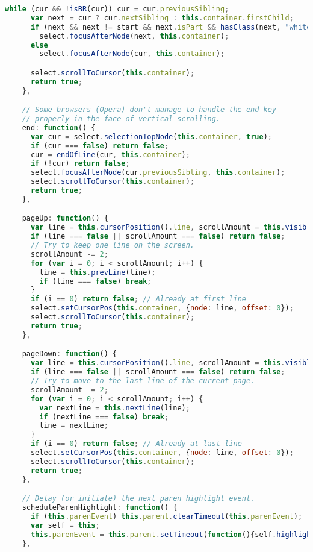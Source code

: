 \begin{lstlisting}[language=Javascript]
      while (cur && !isBR(cur)) cur = cur.previousSibling;
      var next = cur ? cur.nextSibling : this.container.firstChild;
      if (next && next != start && next.isPart && hasClass(next, "whitespace"))
        select.focusAfterNode(next, this.container);
      else
        select.focusAfterNode(cur, this.container);

      select.scrollToCursor(this.container);
      return true;
    },

    // Some browsers (Opera) don't manage to handle the end key
    // properly in the face of vertical scrolling.
    end: function() {
      var cur = select.selectionTopNode(this.container, true);
      if (cur === false) return false;
      cur = endOfLine(cur, this.container);
      if (!cur) return false;
      select.focusAfterNode(cur.previousSibling, this.container);
      select.scrollToCursor(this.container);
      return true;
    },

    pageUp: function() {
      var line = this.cursorPosition().line, scrollAmount = this.visibleLineCount();
      if (line === false || scrollAmount === false) return false;
      // Try to keep one line on the screen.
      scrollAmount -= 2;
      for (var i = 0; i < scrollAmount; i++) {
        line = this.prevLine(line);
        if (line === false) break;
      }
      if (i == 0) return false; // Already at first line
      select.setCursorPos(this.container, {node: line, offset: 0});
      select.scrollToCursor(this.container);
      return true;
    },

    pageDown: function() {
      var line = this.cursorPosition().line, scrollAmount = this.visibleLineCount();
      if (line === false || scrollAmount === false) return false;
      // Try to move to the last line of the current page.
      scrollAmount -= 2;
      for (var i = 0; i < scrollAmount; i++) {
        var nextLine = this.nextLine(line);
        if (nextLine === false) break;
        line = nextLine;
      }
      if (i == 0) return false; // Already at last line
      select.setCursorPos(this.container, {node: line, offset: 0});
      select.scrollToCursor(this.container);
      return true;
    },

    // Delay (or initiate) the next paren highlight event.
    scheduleParenHighlight: function() {
      if (this.parenEvent) this.parent.clearTimeout(this.parenEvent);
      var self = this;
      this.parenEvent = this.parent.setTimeout(function(){self.highlightParens();}, 300);
    },


\end{lstlisting}
